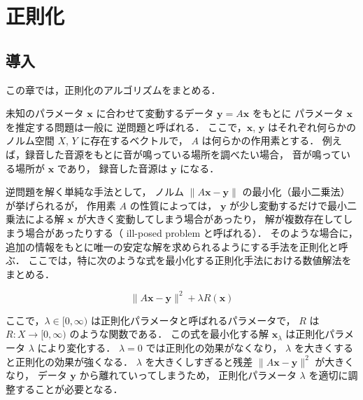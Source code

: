 %

\part{正則化}\label{part:regularization}

\chapter{導入}

この章では，正則化のアルゴリズムをまとめる．

未知のパラメータ $\bm{x}$ に合わせて変動するデータ $\bm{y} = A \bm{x}$ をもとに
パラメータ $\bm{x}$ を推定する問題は一般に  逆問題と呼ばれる．
ここで，$\bm{x}$, $\bm{y}$ はそれぞれ何らかのノルム空間 $X$, $Y$ に存在するベクトルで，
$A$ は何らかの作用素とする．
例えば，録音した音源をもとに音が鳴っている場所を調べたい場合，
音が鳴っている場所が $\bm{x}$ であり，
録音した音源は $\bm{y}$ になる．

逆問題を解く単純な手法として，
ノルム $\|A \bm{x} - \bm{y}\|$ の最小化（最小二乗法）が挙げられるが，
作用素 $A$ の性質によっては，
$\bm{y}$ が少し変動するだけで最小二乗法による解 $\bm{x}$ が大きく変動してしまう場合があったり，
解が複数存在してしまう場合があったりする（ ill-posed problem と呼ばれる）．
そのような場合に，追加の情報をもとに唯一の安定な解を求められるようにする手法を正則化と呼ぶ．
ここでは，特に次のような式を最小化する正則化手法における数値解法をまとめる．

\begin{equation}
    \|A \bm{x} - \bm{y}\|^2 + \lambda R(\bm{x})
    \label{eq:regularization_intro_general-regularization}
\end{equation}

ここで，$\lambda \in [0, \infty)$ は正則化パラメータと呼ばれるパラメータで，
$R$ は $R : X \to [0, \infty)$ のような関数である．
この式を最小化する解 $\bm{x}_{\lambda}$ は正則化パラメータ $\lambda$ により変化する．
$\lambda = 0$ では正則化の効果がなくなり，
$\lambda$ を大きくすると正則化の効果が強くなる．
$\lambda$ を大きくしすぎると残差 $\|A \bm{x} - \bm{y}\|^2$ が大きくなり，
データ $\bm{y}$ から離れていってしまうため，
正則化パラメータ $\lambda$ を適切に調整することが必要となる．







